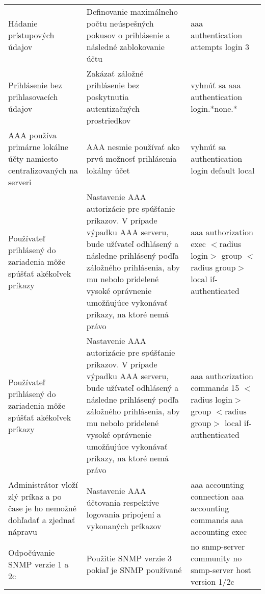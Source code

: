 \begin{longtable}[!htbp]{|L{10em}L{10em}L{34em}|}
	
	
	
	Hádanie prístupových údajov	&Definovanie maximálneho počtu neúspešných pokusov o prihlásenie a následné zablokovanie účtu	&aaa authentication attempts login 3\\
	
	
	
	
	 Prihlásenie bez prihlasovacích údajov	&Zakázať záložné prihlásenie bez poskytnutia autentizačných prostriedkov	&vyhnúť sa aaa authentication login.*none.*\\
	
	
	
	
	AAA používa primárne lokálne účty namiesto centralizovaných na serveri	&AAA nesmie používať ako prvú možnosť prihlásenia lokálny účet 	&vyhnúť sa authentication login default local\\
	
	
	
	
	 Používateľ prihlásený do zariadenia môže spúšťať akékoľvek príkazy	&Nastavenie AAA autorizácie pre spúšťanie príkazov. V prípade výpadku AAA serveru, bude užívateľ odhlásený a následne prihlásený podľa  záložného prihlásenia, aby mu nebolo pridelené vysoké oprávnenie umožňujúce vykonávať príkazy, na ktoré nemá právo	&aaa authorization exec $<$radius login$>$ group $<$radius group$>$ local if-authenticated\\
	
	
	
	
	Používateľ prihlásený do zariadenia môže spúšťať akékoľvek príkazy	&Nastavenie AAA autorizácie pre spúšťanie príkazov. V prípade výpadku AAA serveru, bude užívateľ odhlásený a následne prihlásený podľa  záložného prihlásenia, aby mu nebolo pridelené vysoké oprávnenie umožňujúce vykonávať príkazy, na ktoré nemá právo	&aaa authorization commands 15 $<$radius login$>$ group $<$radius group$>$ local if-authenticated \\
	
	
	
	
	 Administrátor vloží zlý príkaz a po čase je ho nemožné dohľadať a zjednať nápravu	&Nastavenie AAA účtovania respektíve logovania pripojení a vykonaných príkazov	&aaa accounting connection
	aaa accounting commands
	aaa accounting exec\\
	
	
	
	
	Odpočúvanie SNMP verzie 1 a 2c	&Použitie SNMP verzie 3 pokiaľ je SNMP používané	&no snmp-server community
	no snmp-server host  version 1/2c
	

\end{longtable}

